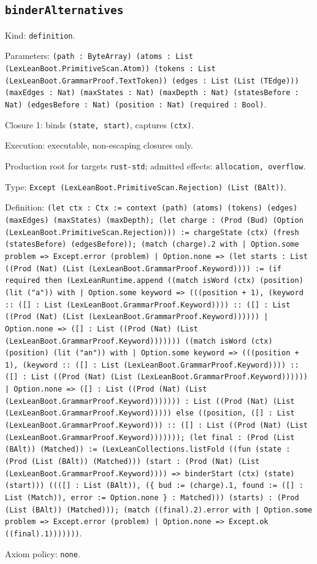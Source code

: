 \documentclass[11pt]{article}
\begin{document}
\subsection*{\texttt{binderAlternatives}}
\noindent Kind: \texttt{definition}.\par
\noindent Parameters: \texttt{(path : ByteArray) (atoms : List (LexLeanBoot.PrimitiveScan.Atom)) (tokens : List (LexLeanBoot.GrammarProof.TextToken)) (edges : List (List (TEdge))) (maxEdges : Nat) (maxStates : Nat) (maxDepth : Nat) (statesBefore : Nat) (edgesBefore : Nat) (position : Nat) (required : Bool)}.\par
\noindent Closure 1: binds \texttt{(state, start)}, captures \texttt{(ctx)}.\par
\noindent Execution: executable, non-escaping closures only.\par
\noindent Production root for targets \texttt{rust-std}; admitted effects: \texttt{allocation, overflow}.\par
\noindent Type: \texttt{Except (LexLeanBoot.PrimitiveScan.Rejection) (List (BAlt))}.\par
\noindent Definition: \texttt{(let ctx : Ctx := context (path) (atoms) (tokens) (edges) (maxEdges) (maxStates) (maxDepth); (let charge : (Prod (Bud) (Option (LexLeanBoot.PrimitiveScan.Rejection))) := chargeState (ctx) (fresh (statesBefore) (edgesBefore)); (match (charge).2 with | Option.some problem => Except.error (problem) | Option.none => (let starts : List ((Prod (Nat) (List (LexLeanBoot.GrammarProof.Keyword)))) := (if required then (LexLeanRuntime.append ((match isWord (ctx) (position) (lit ("a")) with | Option.some keyword => (((position + 1), (keyword :: ([] : List (LexLeanBoot.GrammarProof.Keyword)))) :: ([] : List ((Prod (Nat) (List (LexLeanBoot.GrammarProof.Keyword)))))) | Option.none => ([] : List ((Prod (Nat) (List (LexLeanBoot.GrammarProof.Keyword))))))) ((match isWord (ctx) (position) (lit ("an")) with | Option.some keyword => (((position + 1), (keyword :: ([] : List (LexLeanBoot.GrammarProof.Keyword)))) :: ([] : List ((Prod (Nat) (List (LexLeanBoot.GrammarProof.Keyword)))))) | Option.none => ([] : List ((Prod (Nat) (List (LexLeanBoot.GrammarProof.Keyword))))))) : List ((Prod (Nat) (List (LexLeanBoot.GrammarProof.Keyword))))) else ((position, ([] : List (LexLeanBoot.GrammarProof.Keyword))) :: ([] : List ((Prod (Nat) (List (LexLeanBoot.GrammarProof.Keyword))))))); (let final : (Prod (List (BAlt)) (Matched)) := (LexLeanCollections.listFold ((fun (state : (Prod (List (BAlt)) (Matched))) (start : (Prod (Nat) (List (LexLeanBoot.GrammarProof.Keyword)))) => binderStart (ctx) (state) (start))) ((([] : List (BAlt)), (\{ bud := (charge).1, found := ([] : List (Match)), error := Option.none \} : Matched))) (starts) : (Prod (List (BAlt)) (Matched))); (match ((final).2).error with | Option.some problem => Except.error (problem) | Option.none => Except.ok ((final).1)))))))}.\par
\noindent Axiom policy: \texttt{none}.\par
\end{document}
